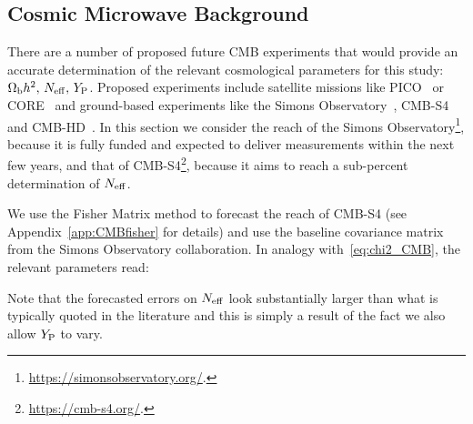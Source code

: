 \subsection{Cosmic Microwave Background}\label{sec:future_CMB}
There are a number of proposed future CMB experiments that would provide an accurate determination of the relevant cosmological parameters for this study: $\Omega_{\mathrm{b}} h^2,\,N_{\rm eff},\,Y_{\rm P}$. Proposed experiments include satellite missions like PICO~\cite{Hanany:2019lle} or CORE~\cite{DiValentino:2016foa} and ground-based experiments like the Simons Observatory~\cite{Ade:2018sbj}, CMB-S4~\cite{Abazajian:2016yjj,Abazajian:2019eic} and CMB-HD~\cite{Sehgal:2019ewc}. In this section we consider the reach of the Simons Observatory\footnote{\url{https://simonsobservatory.org/}.}, because it is fully funded and expected to deliver measurements within the next few years, and that of CMB-S4\footnote{\url{https://cmb-s4.org/}.}, because it aims to reach a sub-percent determination of $N_{\rm eff}$.

We use the Fisher Matrix method to forecast the reach of CMB-S4 (see Appendix~\ref{app:CMBfisher} for details) and use the baseline covariance matrix from the Simons Observatory collaboration. In analogy with~\eqref{eq:chi2_CMB}, the relevant parameters read:

\begin{center}
\end{center}
Note that the forecasted errors on $N_{\rm eff}$ look substantially larger than what is typically quoted in the literature and this is simply a result of the fact we also allow $Y_{\rm P}$ to vary.

